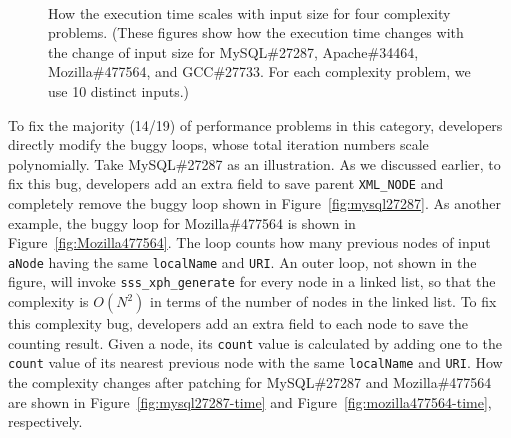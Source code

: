 \begin{figure*}
\centering
{} 
 \\ 
\vspace{-0.1in}
\caption{How the execution time scales with input size for four complexity problems. 
\footnotesize{(These figures show how the execution time changes with the change of input size for MySQL\#27287, 
 Apache\#34464, Mozilla\#477564, and GCC\#27733. For each complexity problem, we use 10 distinct inputs.)}} 
 \vspace{-0.05in}
\label{fig:time} 
\vspace{-0.15in}
\end{figure*} 

To fix the majority (14/19) of performance problems in this category,
developers directly modify the buggy loops, 
whose total iteration numbers scale polynomially.
Take MySQL\#27287 as an illustration.
As we discussed earlier, to fix this bug,
developers add an extra field to save parent \texttt{XML\_NODE}
and completely remove the buggy loop shown in Figure~\ref{fig:mysql27287}.
As another example, the buggy loop for Mozilla\#477564 is shown in Figure~\ref{fig:Mozilla477564}.
The loop counts how many previous nodes of input \texttt{aNode} 
having the same \texttt{localName} and \texttt{URI}.
An outer loop, not shown in the figure, 
will invoke \texttt{sss\_xph\_generate} for every node in a linked list, 
so that the complexity is $O(N^2)$ in terms of the number of nodes in the linked list.
To fix this complexity bug, developers add an extra field to each node to 
save the counting result. 
Given a node, 
its \texttt{count} value is calculated by adding one 
to the \texttt{count} value of 
its nearest previous node with the same \texttt{localName} and \texttt{URI}.  
How the complexity changes after patching for MySQL\#27287 and Mozilla\#477564 are 
shown in Figure~\ref{fig:mysql27287-time} and Figure~\ref{fig:mozilla477564-time}, respectively. 



